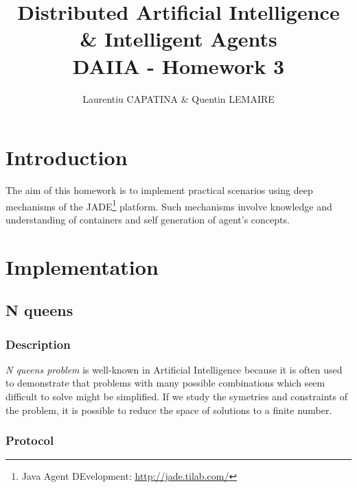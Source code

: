\documentclass[a4paper,11pt]{article}
\title{Distributed Artificial Intelligence \& Intelligent Agents \\ DAIIA - Homework 3}
\author{Laurentiu CAPATINA \& Quentin LEMAIRE}
\begin{document}
  \maketitle %

  \section{Introduction}
  
  The aim of this homework is to implement practical scenarios using deep 
mechanisms of the JADE\footnote{Java Agent DEvelopment: \href{http://jade.tilab.com/}{http://jade.tilab.com/}} 
  platform. Such mechanisms involve knowledge and understanding of containers and self 
  generation of agent's concepts.


  \newcommand{\pa}{\textit{Profiler Agent}}
  \newcommand{\cu}{\textit{Curator Agent}}
  \renewcommand{\to}{\textit{Tour Guide Agent}}
  \newcommand{\am}{\textit{Artist Manager Agent}}
  
  \section{Implementation}
  
  \subsection{N queens}

  \subsubsection{Description}
  
  \textit{N queens problem} is well-known in Artificial Intelligence because it is often 
  used to demonstrate that problems with many possible combinations which seem difficult to solve 
  might be simplified. If we study the symetries and constraints of the problem, it is 
  possible to reduce the space of solutions to a finite number.
  
  \subsubsection{Protocol}
  
\end{document}

